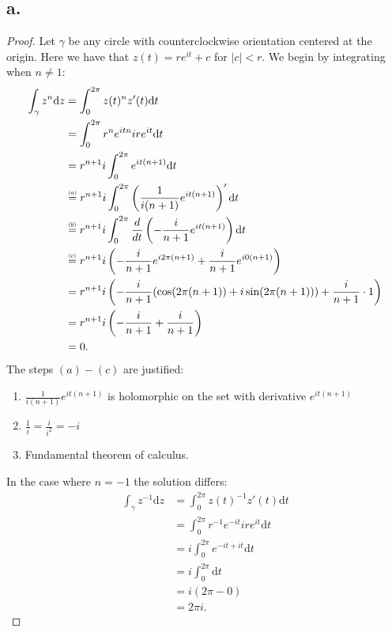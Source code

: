 \documentclass{article}
\newcommand\numeq[1]%
  {\stackrel{\scriptscriptstyle(\mkern-1.5mu#1\mkern-1.5mu)}{=}}
\begin{document}
\subsection*{a.}
\begin{proof}
Let $\gamma$ be any circle with counterclockwise orientation centered at the origin. Here we have that $z(t) = re^{it} + c$ for $|c| < r$. We begin by integrating when $n \neq 1$:
\begin{align*}
  \int_{\gamma}z^n \mathrm{d}z &= \int_0^{2\pi}z(t)^nz'(t)\mathrm{d}t\\
  &= \int_0^{2\pi} r^ne^{itn}ire^{it} \mathrm{d}t\\
  &= r^{n + 1}i\int_0^{2\pi}e^{it(n + 1)} \mathrm{d}t \\
  &\numeq{a} r^{n+1}i \int_0^{2 \pi} \left(\frac{1}{i(n + 1)}e^{it(n + 1)} \right)^{\prime} \mathrm{d}t\\
  &\numeq{b} r^{n+1}i \int_0^{2 \pi} \frac{d}{dt}\left(-\frac{i}{n + 1}e^{it(n + 1)} \right)\mathrm{d}t \\
  &\numeq{c} r^{n+1}i \left(-\frac{i}{n + 1}e^{i2\pi(n + 1)} + \frac{i}{n + 1}e^{i 0 (n + 1)} \right)\\
  &= r^{n+1}i \left(-\frac{i}{n + 1}(\cos(2\pi(n + 1)) + i \sin(2\pi(n + 1))) + \frac{i}{n + 1}\cdot 1 \right)\\
  &= r^{n+1}i\left(-\frac{i}{n + 1} + \frac{i}{n + 1} \right) \\
  &= 0.
\end{align*}
The steps $(a)-(c)$ are justified:
\begin{enumerate}[\indent(a)]
  \item $\frac{1}{i(n + 1)}e^{it(n + 1)}$ is holomorphic on the set with derivative $e^{it(n + 1)}$
  \item $\frac{1}{i} = \frac{i}{i^2} = -i$
  \item Fundamental theorem of calculus.
\end{enumerate}
In the case where $n = -1$ the solution differs: 
\begin{align*}
  \int_{\gamma}z^{-1} \mathrm{d}z &= \int_0^{2\pi} z(t)^{-1} z'(t) \mathrm{d}t \\
  &= \int_0^{2 \pi} r^{-1}e^{-it}ire^{it} \mathrm{d}t \\
  &= i\int_0^{2 \pi} e^{-it + it}\mathrm{d}t \\
  &= i\int_0^{2 \pi} \mathrm{d}t \\
  &= i(2 \pi - 0) \\
  &= 2\pi  i.
\end{align*}
\end{proof}
\end{document}
